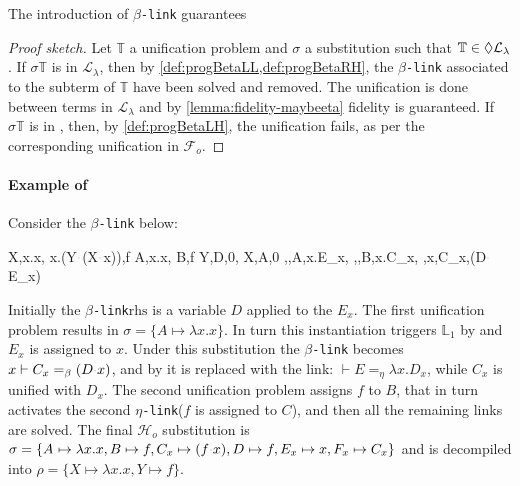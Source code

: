\documentclass[sigconf,natbib=false,review]{acmart}
\newcommand{\appsep}{\ensuremath{\textcolor{lightgray}{\cdot}}}
\newcommand{\llambda}{\ensuremath{\mathcal{L}_\lambda}\xspace}
\newcommand{\linkMacro}[1]{\ensuremath{#1}\texttt{-link}\xspace}
\newcommand{\linkbeta}{\linkMacro{\beta}}
\newcommand{\linketa} {\linkMacro{\eta}}
\newcommand{\Fo}{\ensuremath{\mathcal{F}_{\!o}\xspace}} %
\newcommand{\Ho}{\ensuremath{\mathcal{H}_o}\xspace}
\newcommand{\linketaM}[3]{\ensuremath{#1 \vdash #2 =_\eta #3}}
\newcommand{\linkbetaM}[3]{\ensuremath{#1 \vdash #2 =_\beta #3}}
\newcommand{\rhs}{\ensuremath{\mathrm{rhs}}\xspace}
\newcommand{\linkStore}{\ensuremath{\mathbb{L}}\xspace}
\newcommand{\hoUnifPb}{\ensuremath{\mathbb{T}}\xspace}
\begin{document}

\begin{lemma}[Fidelity with \linkbeta]
  The introduction of \linkbeta guarantees 
\end{lemma}

\begin{proof}[Proof sketch]
  Let \hoUnifPb a unification problem and $\sigma$ a substitution
  such that $\hoUnifPb \in \notllambda$. 
  If $\sigma\hoUnifPb$ is in \llambda, then by
  \cref{def:progBetaLL,def:progBetaRH}, the \linkbeta associated to the subterm of
  \hoUnifPb have been solved and removed. The
  unification is done between terms in \llambda and by \cref{lemma:fidelity-maybeeta}
  fidelity is guaranteed. If $\sigma\hoUnifPb$ is in \notllambda,
  then, by \cref{def:progBetaLH}, the unification fails, as per the
  corresponding unification in \Fo{}.
\end{proof}

\paragraph{Example of \progBetaLL}
Consider the \linkbeta below:

\printAlll
  {{{X,\lambda x.x},
    {\lambda x.(Y\appsep (X\appsep x)),f}}}
  {{{A,\lambda x.x},
    {B,f}}}
  {{{Y,D,0},
    {X,A,0}}}
  {{{\eta,,A,\lambda x.E_{x}},
    {\eta,,B,\lambda x.C_{x}},
    {\beta,x,C_{x},(D\appsep E_{x})}}}

\noindent
Initially the \linkbeta \rhs is a variable $D$ applied to the $E_x$.
The first unification problem results in $\sigma =
\{A \mapsto \lambda x.x\}$. In turn this instantiation
triggers $\linkStore_1$ by \progressetaleft 
and $E_x$ is assigned to $x$.
Under this substitution the \linkbeta becomes
\linkbetaM{x}{C_x}{(D \appsep x)}, and by \progBetaLL
it is replaced with the link:
\linketaM{}{E}{\lambda x.D_x}, while $C_x$ is unified with $D_x$. The second unification
problem assigns $f$ to $B$, that in turn activates
the second \linketa ($f$ is assigned to $C$), and then all the remaining links
are solved. The final \Ho substitution is $\sigma = \{A _{} \mapsto \lambda x.x, 
B _{} \mapsto f, C _{x} \mapsto (f\appsep x), 
D _{} \mapsto f, E _{x} \mapsto x, F _{x} \mapsto C_{x} \}$ and is decompiled into $\rho = \{X \mapsto \lambda x.x,
Y \mapsto f\}$.
\end{document}

